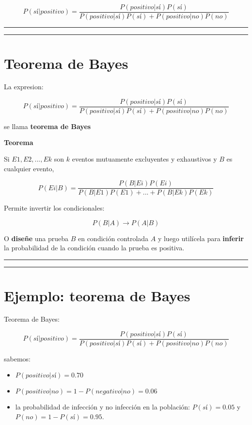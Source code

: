 \documentclass[
]{book}
\begin{document}
\[P(sí|positivo)=\frac{P(positivo|sí)P(sí)}{P(positivo|sí)P(sí)+P(positivo|no)P(no)}\]

\begin{center}\rule{0.5\linewidth}{0.5pt}\end{center}

\begin{center}\rule{0.5\linewidth}{0.5pt}\end{center}

\hypertarget{teorema-de-bayes}{%
\section{Teorema de Bayes}\label{teorema-de-bayes}}

La expresion:

\[P(sí|positivo)=\frac{P(positivo|sí)P(sí)}{P(positivo|sí)P(sí)+P(positivo|no)P(no)}\]

se llama \textbf{teorema de Bayes}

\textbf{Teorema}

Si \(E1, E2, ..., Ek\) son \(k\) eventos mutuamente excluyentes y exhaustivos y \(B\) es cualquier evento,

\[P(Ei|B)=\frac{P(B|Ei)P(Ei)}{P(B|E1)P(E1) +...+ P(B|Ek)P(Ek)} \]

Permite invertir los condicionales:

\[P(B|A) \rightarrow P(A|B)\]

O \textbf{diseñe} una prueba \(B\) en condición controlada \(A\) y luego utilícela para \textbf{inferir} la probabilidad de la condición cuando la prueba es positiva.

\begin{center}\rule{0.5\linewidth}{0.5pt}\end{center}

\begin{center}\rule{0.5\linewidth}{0.5pt}\end{center}

\hypertarget{ejemplo-teorema-de-bayes}{%
\section{Ejemplo: teorema de Bayes}\label{ejemplo-teorema-de-bayes}}

Teorema de Bayes:

\[P(sí|positivo) = \frac{P(positivo|sí) P(sí)}{P(positivo|sí)P(sí)+P(positivo|no)P(no)}\]

sabemos:

\begin{itemize}
\item
  \(P(positivo|sí)=0.70\)
\item
  \(P(positivo|no)=1- P(negativo|no)=0.06\)
\item
  la probabilidad de infección y no infección en la población: \(P(sí)=0.05\) y \(P(no)=1-P(sí)=0.95\).
\end{itemize}
\end{document}
